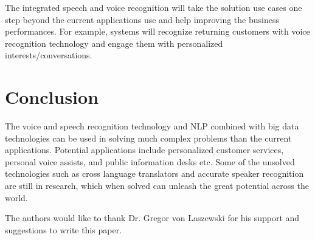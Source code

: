 \documentclass[sigconf]{acmart}
\begin{document}
The integrated speech and voice recognition will take the solution use cases one step beyond the current applications use and help improving the business performances. For example, systems will recognize returning customers with voice recognition technology and engage them with personalized interests/conversations. 

\section{Conclusion}
The voice and speech recognition technology and NLP combined with big data technologies can be used in solving much complex problems than the current applications. Potential applications include personalized customer services, personal voice assists, and public information desks etc. Some of the unsolved technologies such as cross language translators and accurate speaker recognition are still in research, which when solved can unleash the great potential across the world.

\begin{acks}

  The authors would like to thank Dr. Gregor von Laszewski for his support and suggestions to write this paper.

\end{acks}


 

\appendix
\end{document}
